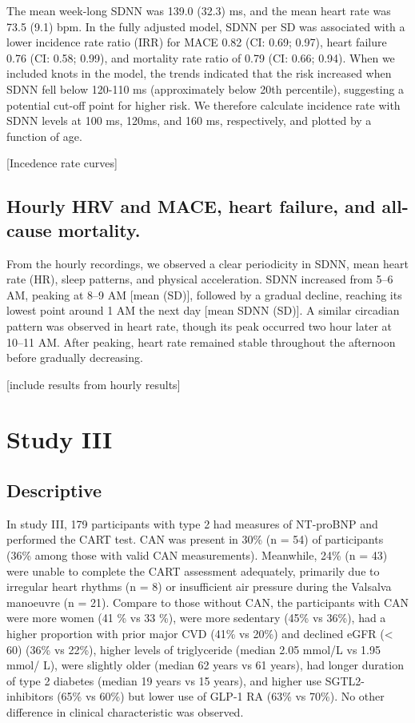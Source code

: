 \documentclass[
  a4paper,
  headsepline=true,
  open=any]{scrbook}
\begin{document}
The mean week-long SDNN was 139.0 (32.3) ms, and the mean heart rate was
73.5 (9.1) bpm. In the fully adjusted model, SDNN per SD was associated
with a lower incidence rate ratio (IRR) for MACE 0.82 (CI: 0.69; 0.97),
heart failure 0.76 (CI: 0.58; 0.99), and mortality rate ratio of 0.79
(CI: 0.66; 0.94). When we included knots in the model, the trends
indicated that the risk increased when SDNN fell below 120-110 ms
(approximately below 20th percentile), suggesting a potential cut-off
point for higher risk. We therefore calculate incidence rate with SDNN
levels at 100 ms, 120ms, and 160 ms, respectively, and plotted by a
function of age.

{[}Incedence rate curves{]}

\hypertarget{hourly-hrv-and-mace-heart-failure-and-all-cause-mortality.}{%
\subsection{Hourly HRV and MACE, heart failure, and all-cause
mortality.}\label{hourly-hrv-and-mace-heart-failure-and-all-cause-mortality.}}

From the hourly recordings, we observed a clear periodicity in SDNN,
mean heart rate (HR), sleep patterns, and physical acceleration. SDNN
increased from 5--6 AM, peaking at 8--9 AM {[}mean (SD){]}, followed by
a gradual decline, reaching its lowest point around 1 AM the next day
{[}mean SDNN (SD){]}. A similar circadian pattern was observed in heart
rate, though its peak occurred two hour later at 10--11 AM. After
peaking, heart rate remained stable throughout the afternoon before
gradually decreasing.

{[}include results from hourly results{]}

\hypertarget{study-iii}{%
\section{Study III}\label{study-iii}}

\hypertarget{descriptive-2}{%
\subsection{Descriptive}\label{descriptive-2}}

In study III, 179 participants with type 2 had measures of NT-proBNP and
performed the CART test. CAN was present in 30\% (n = 54) of
participants (36\% among those with valid CAN measurements). Meanwhile,
24\% (n = 43) were unable to complete the CART assessment adequately,
primarily due to irregular heart rhythms (n = 8) or insufficient air
pressure during the Valsalva manoeuvre (n = 21). Compare to those
without CAN, the participants with CAN were more women (41 \% vs 33 \%),
were more sedentary (45\% vs 36\%), had a higher proportion with prior
major CVD (41\% vs 20\%) and declined eGFR (\textless{} 60) (36\% vs
22\%), higher levels of triglyceride (median 2.05 mmol/L vs 1.95 mmol/
L), were slightly older (median 62 years vs 61 years), had longer
duration of type 2 diabetes (median 19 years vs 15 years), and higher
use SGTL2-inhibitors (65\% vs 60\%) but lower use of GLP-1 RA (63\% vs
70\%). No other difference in clinical characteristic was observed.
\end{document}
